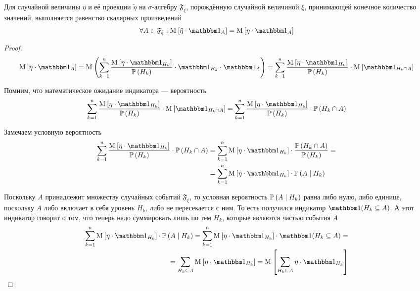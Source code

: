 \begin{lemma}
  Для случайной величины $\eta$ и её проекции $\tilde{\eta}$
  на $\sigma$-алгебру $\mathfrak{F}_\xi$,
  порождённую случайной величиной $\xi$,
  принимающей конечное количество значений,
  выполняется равенство скалярных произведений
  \begin{equation}\label{scalarMulEquality}
      \forall A \in \mathfrak{F}_\xi:
      \Mean{ \tilde{\eta} \cdot \indicatorof{A} }
      = \Mean{ \eta \cdot \indicatorof{A} }
  \end{equation}
\end{lemma}
\begin{proof}
  \begin{equation*}
    \Mean{ \tilde{\eta} \cdot \indicatorof{A} }
    = \mean{\left( \sum_{k=1}^n
      \frac{\Mean{ \eta \cdot \indicatorof{H_k} }}
      {\probability{H_k}}
      \cdot \indicatorof{H_k} \cdot \indicatorof{A} \right)}
    = \sum_{k=1}^n
      \frac{\Mean{ \eta \cdot \indicatorof{H_k} }}
      {\probability{H_k}}
      \cdot \Mean{ \indicatorof{H_k \cap A} }
  \end{equation*}

Помним, что математическое ожидание индикатора --- вероятность
$$\sum_{k=1}^n
  \frac{\Mean{ \eta \cdot \indicatorof{H_k} }}{\probability{H_k}}
      \cdot \Mean{ \indicatorof{H_k \cap A} }
  = \sum_{k=1}^n \frac{\Mean{ \eta \cdot \indicatorof{H_k} }}
      {\probability{H_k}}
      \cdot \probability{H_k \cap A}$$

Замечаем условную вероятность
\begin{align*}
  \sum_{k=1}^n \frac{\Mean{ \eta \cdot \indicatorof{H_k} }}
      {\probability{H_k}} \cdot \probability{H_k \cap A}
  &= \sum_{k=1}^n \Mean{ \eta \cdot \indicatorof{H_k} }
      \cdot \frac{\probability{H_k \cap A}}{\probability{H_k}} = \\
  &= \sum_{k=1}^n \Mean{ \eta \cdot \indicatorof{H_k} }
      \cdot \probability{A \mcond H_k}
\end{align*}

Поскольку $A$ принадлежит множеству случайных событий $\mathfrak{F}_\xi$,
то условная вероятность $\mathbb{P}\left( A\;\middle|\; H_k \right)$ равна либо нулю, либо единице,
поскольку $A$ либо включает в себя уровень $H_k$, либо не пересекается с ним.
То есть получился индикатор $\indicator{H_k \subseteq A}$.
А этот индикатор говорит о том, что теперь надо суммировать лишь по тем $H_k$,
которые являются частью события $A$
\begin{align*}
\sum_{k=1}^n \Mean{ \eta \cdot \indicatorof{H_k} }
  \cdot \probability{A \mcond H_k}
  = \sum_{k=1}^n \Mean{ \eta \cdot \indicatorof{H_k} }
      \cdot \indicator{H_k \subseteq A} = \\
  = \sum_{H_k \subseteq A} \Mean{ \eta \cdot \indicatorof{H_k} }
  = \Mean{ \sum_{H_k \subseteq A} \eta \cdot \indicatorof{H_k} }
\end{align*}


\end{proof}
